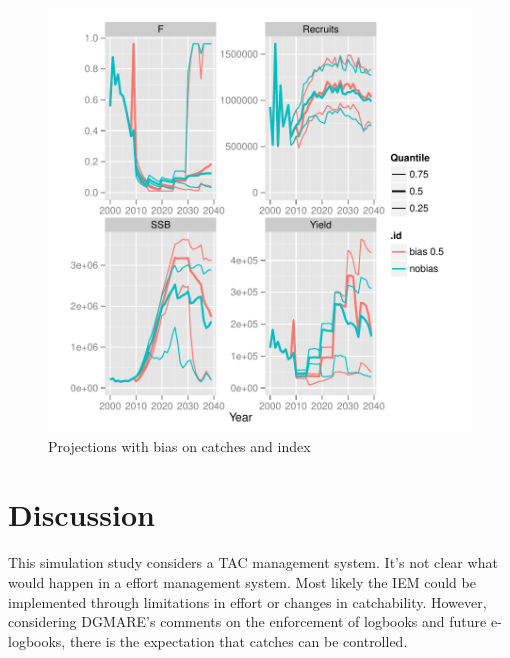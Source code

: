 \documentclass[a4paper]{article}
\begin{document}
\begin{figure}[H]
\centering
\includegraphics{MSE-007}
\caption{Projections with bias on catches and index}
\label{fig:2Bias}
\end{figure}

\section{Discussion}

This simulation study considers a TAC management system. It's not clear what would happen in a effort management system. Most likely the IEM could be implemented through limitations in effort or changes in catchability. However, considering DGMARE's comments on the enforcement of logbooks and future e-logbooks, there is the expectation that catches can be controlled.
\end{document}
